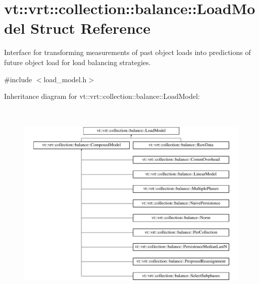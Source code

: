 \hypertarget{structvt_1_1vrt_1_1collection_1_1balance_1_1_load_model}{}\section{vt\+:\+:vrt\+:\+:collection\+:\+:balance\+:\+:Load\+Model Struct Reference}
\label{structvt_1_1vrt_1_1collection_1_1balance_1_1_load_model}


Interface for transforming measurements of past object loads into predictions of future object load for load balancing strategies.  




{\ttfamily \#include $<$load\+\_\+model.\+h$>$}

Inheritance diagram for vt\+:\+:vrt\+:\+:collection\+:\+:balance\+:\+:Load\+Model\+:\begin{figure}[H]
\begin{center}
\leavevmode
\includegraphics[height=10.000000cm]{structvt_1_1vrt_1_1collection_1_1balance_1_1_load_model}
\end{center}
\end{figure}
